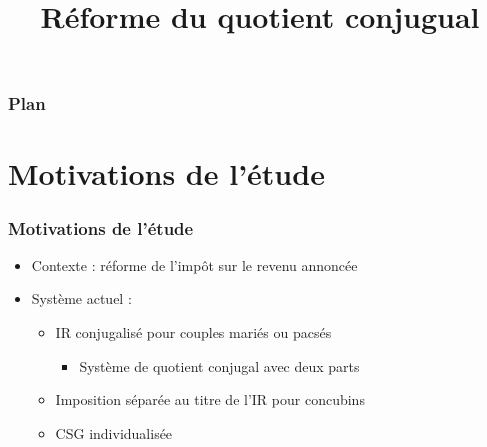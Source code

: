 \documentclass{beamer}
\title{Réforme du quotient conjugual}
\begin{document}
\begin{frame}
\titlepage
\end{frame}

\begin{frame}
\frametitle{Plan}
\tableofcontents
\end{frame}

\section{Motivations de l'étude}

\begin{frame}
\frametitle{Motivations de l'étude}
\begin{itemize}
\item Contexte : réforme de l'impôt sur le revenu annoncée

\item Système actuel : 

\begin{itemize}

\item IR conjugalisé pour couples mariés ou pacsés 

\begin{itemize}

\item Système de quotient conjugal avec deux parts

\end{itemize}

\item Imposition séparée au titre de l'IR pour concubins

\item CSG individualisée

\end{itemize}

\end{itemize}
\end{frame}
\end{document}
